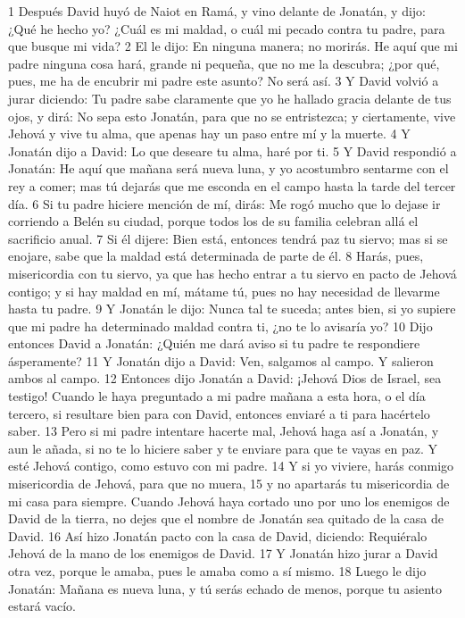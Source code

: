 1 Después David huyó de Naiot en Ramá, y vino delante de Jonatán, y dijo: ¿Qué he hecho yo? ¿Cuál es mi maldad, o cuál mi pecado contra tu padre, para que busque mi vida?
2 El le dijo: En ninguna manera; no morirás. He aquí que mi padre ninguna cosa hará, grande ni pequeña, que no me la descubra; ¿por qué, pues, me ha de encubrir mi padre este asunto? No será así.
3 Y David volvió a jurar diciendo: Tu padre sabe claramente que yo he hallado gracia delante de tus ojos, y dirá: No sepa esto Jonatán, para que no se entristezca; y ciertamente, vive Jehová y vive tu alma, que apenas hay un paso entre mí y la muerte.
4 Y Jonatán dijo a David: Lo que deseare tu alma, haré por ti.
5 Y David respondió a Jonatán: He aquí que mañana será nueva luna, y yo acostumbro sentarme con el rey a comer; mas tú dejarás que me esconda en el campo hasta la tarde del tercer día.
6 Si tu padre hiciere mención de mí, dirás: Me rogó mucho que lo dejase ir corriendo a Belén su ciudad, porque todos los de su familia celebran allá el sacrificio anual.
7 Si él dijere: Bien está, entonces tendrá paz tu siervo; mas si se enojare, sabe que la maldad está determinada de parte de él.
8 Harás, pues, misericordia con tu siervo, ya que has hecho entrar a tu siervo en pacto de Jehová contigo; y si hay maldad en mí, mátame tú, pues no hay necesidad de llevarme hasta tu padre.
9 Y Jonatán le dijo: Nunca tal te suceda; antes bien, si yo supiere que mi padre ha determinado maldad contra ti, ¿no te lo avisaría yo?
10 Dijo entonces David a Jonatán: ¿Quién me dará aviso si tu padre te respondiere ásperamente?
11 Y Jonatán dijo a David: Ven, salgamos al campo. Y salieron ambos al campo.
12 Entonces dijo Jonatán a David: ¡Jehová Dios de Israel, sea testigo! Cuando le haya preguntado a mi padre mañana a esta hora, o el día tercero, si resultare bien para con David, entonces enviaré a ti para hacértelo saber.
13 Pero si mi padre intentare hacerte mal, Jehová haga así a Jonatán, y aun le añada, si no te lo hiciere saber y te enviare para que te vayas en paz. Y esté Jehová contigo, como estuvo con mi padre.
14 Y si yo viviere, harás conmigo misericordia de Jehová, para que no muera,
15 y no apartarás tu misericordia de mi casa para siempre. Cuando Jehová haya cortado uno por uno los enemigos de David de la tierra, no dejes que el nombre de Jonatán sea quitado de la casa de David.
16 Así hizo Jonatán pacto con la casa de David, diciendo: Requiéralo Jehová de la mano de los enemigos de David.
17 Y Jonatán hizo jurar a David otra vez, porque le amaba, pues le amaba como a sí mismo.
18 Luego le dijo Jonatán: Mañana es nueva luna, y tú serás echado de menos, porque tu asiento estará vacío.
